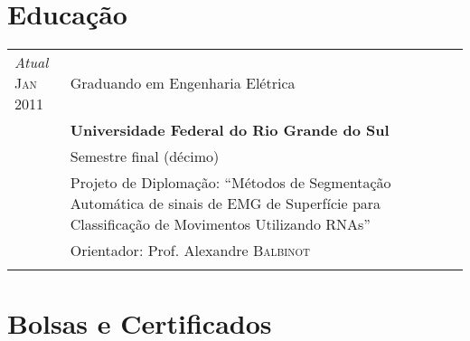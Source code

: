 \documentclass[a4paper,10pt]{article} %
\begin{document}

\section{Educação}

\begin{tabular}{p{1.5cm}|p{12cm}}

\pbox{20cm}{\emph{Atual} \\ \textsc{Jan} 2011} & Graduando em Engenharia Elétrica\\
& \textbf{Universidade Federal do Rio Grande do Sul}\\
& \small Semestre final (décimo)\\
& \footnotesize{Projeto de Diplomação: ``Métodos de Segmentação Automática de sinais de EMG de Superfície para Classificação de Movimentos Utilizando RNAs''} \\
& \small Orientador: Prof. Alexandre \textsc{Balbinot}\\
\multicolumn{2}{c}{} \\

\end{tabular}


\section{Bolsas e Certificados}
\end{document}
